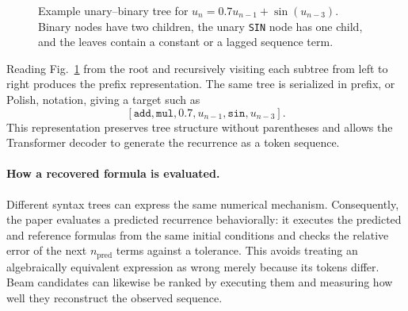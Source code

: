 \begin{figure}[H]
\centering
{}
\caption{Example unary--binary tree for
$u_n=0.7u_{n-1}+\sin(u_{n-3})$. Binary nodes have two children, the unary
\texttt{SIN} node has one child, and the leaves contain a constant or a lagged
sequence term.}
\label{fig:dascoli-unary-binary-tree}
\end{figure}

Reading Fig.~\ref{fig:dascoli-unary-binary-tree} from the root and recursively
visiting each subtree from left to right produces the prefix representation.
The same tree is serialized in prefix, or Polish, notation, giving a target
such as
\[
    [\texttt{add},\texttt{mul},0.7,u_{n-1},
      \texttt{sin},u_{n-3}].
\]
This representation preserves tree structure without parentheses and allows
the Transformer decoder to generate the recurrence as a token sequence.

\paragraph{How a recovered formula is evaluated.}
Different syntax trees can express the same numerical mechanism. Consequently,
the paper evaluates a predicted recurrence behaviorally: it executes the
predicted and reference formulas from the same initial conditions and checks
the relative error of the next $n_{\mathrm{pred}}$ terms against a tolerance.
This avoids treating an algebraically equivalent expression as wrong merely
because its tokens differ. Beam candidates can likewise be ranked by executing
them and measuring how well they reconstruct the observed sequence.

